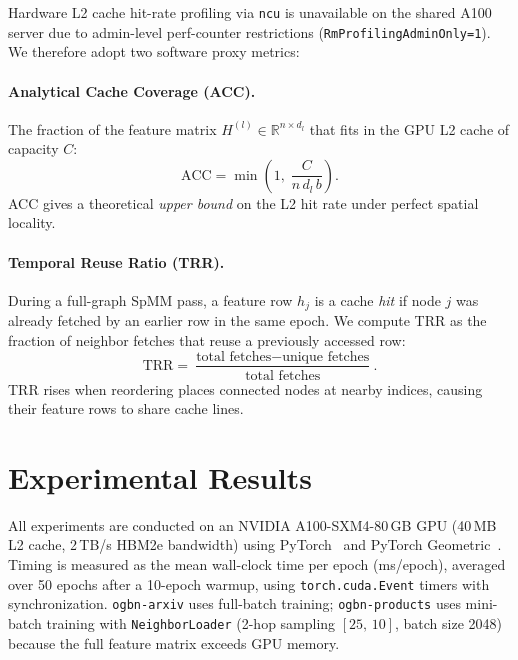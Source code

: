\documentclass[sigconf,review]{acmart}
\begin{document}
Hardware L2 cache hit-rate profiling via \texttt{ncu} is unavailable on the shared A100 server due to admin-level perf-counter restrictions (\texttt{RmProfilingAdminOnly=1}). We therefore adopt two software proxy metrics:

\paragraph{Analytical Cache Coverage (ACC).}
The fraction of the feature matrix $H^{(l)}\!\in\!\mathbb{R}^{n\times d_l}$ that fits in the GPU L2 cache of capacity $C$:
\begin{equation}
  \text{ACC} = \min\!\left(1,\; \frac{C}{n\,d_l\,b}\right).
\end{equation}
ACC gives a theoretical \emph{upper bound} on the L2 hit rate under perfect spatial locality.

\paragraph{Temporal Reuse Ratio (TRR).}
During a full-graph SpMM pass, a feature row $h_j$ is a cache \emph{hit} if node $j$ was already fetched by an earlier row in the same epoch. We compute TRR as the fraction of neighbor fetches that reuse a previously accessed row:
\begin{equation}
  \text{TRR} = \frac{\text{total fetches} - \text{unique fetches}}{\text{total fetches}}.
\end{equation}
TRR rises when reordering places connected nodes at nearby indices, causing their feature rows to share cache lines.

\section{Experimental Results}
\label{sec:results}

All experiments are conducted on an NVIDIA A100-SXM4-80\,GB GPU (40\,MB L2 cache, 2\,TB/s HBM2e bandwidth) using PyTorch~\cite{paszke2019pytorch} and PyTorch Geometric~\cite{fey2019pyg}. Timing is measured as the mean wall-clock time per epoch (ms/epoch), averaged over 50 epochs after a 10-epoch warmup, using \texttt{torch.cuda.Event} timers with synchronization. \texttt{ogbn-arxiv} uses full-batch training; \texttt{ogbn-products} uses mini-batch training with \texttt{NeighborLoader} (2-hop sampling $[25,\,10]$, batch size 2048) because the full feature matrix exceeds GPU memory.
\end{document}
